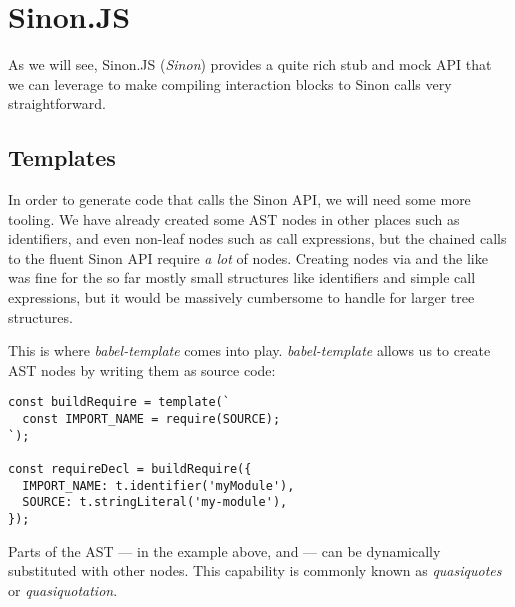 \section{Sinon.JS}
As we will see,
Sinon.JS (\textit{Sinon}) provides a
quite rich stub and mock API
that we can leverage to make
compiling interaction blocks
to Sinon calls very straightforward.

\subsection{Templates}
In order to generate code that calls the Sinon API,
we will need some more tooling.
We have already created some AST nodes in other places such as identifiers,
and even non-leaf nodes such as call expressions,
but the chained calls to the fluent Sinon API
require \textit{a lot} of nodes.
Creating nodes via  and the like was fine
for the so far mostly small structures like
identifiers and simple call expressions,
but it would be massively cumbersome to handle
for larger tree structures.

This is where \textit{babel-template} comes into play.
\textit{babel-template} allows us to create AST nodes
by writing them as source code:
\autocite{BabelTemplateDoc}
\begin{verbatim}
const buildRequire = template(`
  const IMPORT_NAME = require(SOURCE);
`);

const requireDecl = buildRequire({
  IMPORT_NAME: t.identifier('myModule'),
  SOURCE: t.stringLiteral('my-module'),
});
\end{verbatim}
Parts of the AST
--- in the example above,  and  ---
can be dynamically substituted with other nodes.
This capability is commonly known as
\textit{quasiquotes} or \textit{quasiquotation}.
\autocite{LispQuasiquotation}
